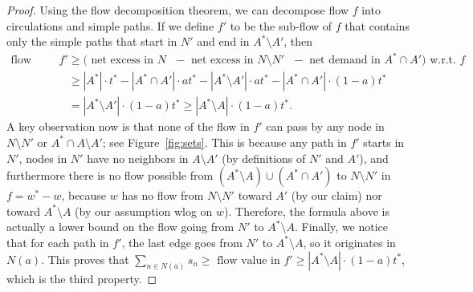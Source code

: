 \begin{proof}
Using the flow decomposition theorem, we can decompose flow $f$ into circulations and simple paths. If we define $f'$ to be the sub-flow of $f$ that contains only the simple paths that start in $N'$ and end in $A^*\setminus A'$, then %
%
\begin{align*}
    \text{flow value in } f' &\geq (\text{ net excess in $N$ } - \text{ net excess in $N\setminus N'$ } - \text{ net demand in $A^*\cap A')$ w.r.t. } f\\
    &\geq |A^*|\cdot t^* - |A^*\cap A'|\cdot a t^* -|A^*\setminus A'|\cdot a t^* -|A^*\cap A'|\cdot (1-a) t^*\\
    & = |A^*\setminus A'|\cdot (1-a)t^* \geq |A^* \setminus A|\cdot (1-a)t^*.
\end{align*}
%
A key observation now is that none of the flow in $f'$ can pass by any node in $N\setminus N'$ or $A^*\cap A\setminus A'$; see Figure~\ref{fig:sets}. 
This is because any path in $f'$ starts in $N'$, nodes in $N'$ have no neighbors in $A\setminus A'$ (by definitions of $N'$ and $A'$), and furthermore there is no flow possible from $(A^*\setminus A)\cup (A^*\cap A')$ to $N\setminus N'$ in $f=w^*-w$, because $w$ has no flow from $N\setminus N'$ toward $A'$ (by our claim) nor toward $A^*\setminus A$ (by our assumption wlog on $w$).
Therefore, the formula above is actually a lower bound on the flow going from $N'$ to $A^*\setminus A$. Finally, we notice that for each path in $f'$, the last edge goes from $N'$ to $A^*\setminus A$, so it originates in $N(a)$. This proves that $\sum_{n\in N(a)} s_n\geq \text{ flow value in } f'\geq |A^* \setminus A|\cdot (1-a) t^*$, which is the third property.
\end{proof}

